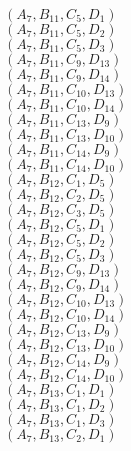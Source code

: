 \documentclass[14pt]{article}
\begin{document}
    $({A}_{7}, {B}_{11}, {C}_{5}, {D}_{1}) $ \\ 
    $({A}_{7}, {B}_{11}, {C}_{5}, {D}_{2}) $ \\ 
    $({A}_{7}, {B}_{11}, {C}_{5}, {D}_{3}) $ \\ 
    $({A}_{7}, {B}_{11}, {C}_{9}, {D}_{13}) $ \\ 
    $({A}_{7}, {B}_{11}, {C}_{9}, {D}_{14}) $ \\ 
    $({A}_{7}, {B}_{11}, {C}_{10}, {D}_{13}) $ \\ 
    $({A}_{7}, {B}_{11}, {C}_{10}, {D}_{14}) $ \\ 
    $({A}_{7}, {B}_{11}, {C}_{13}, {D}_{9}) $ \\ 
    $({A}_{7}, {B}_{11}, {C}_{13}, {D}_{10}) $ \\ 
    $({A}_{7}, {B}_{11}, {C}_{14}, {D}_{9}) $ \\ 
    $({A}_{7}, {B}_{11}, {C}_{14}, {D}_{10}) $ \\ 
    $({A}_{7}, {B}_{12}, {C}_{1}, {D}_{5}) $ \\ 
    $({A}_{7}, {B}_{12}, {C}_{2}, {D}_{5}) $ \\ 
    $({A}_{7}, {B}_{12}, {C}_{3}, {D}_{5}) $ \\ 
    $({A}_{7}, {B}_{12}, {C}_{5}, {D}_{1}) $ \\ 
    $({A}_{7}, {B}_{12}, {C}_{5}, {D}_{2}) $ \\ 
    $({A}_{7}, {B}_{12}, {C}_{5}, {D}_{3}) $ \\ 
    $({A}_{7}, {B}_{12}, {C}_{9}, {D}_{13}) $ \\ 
    $({A}_{7}, {B}_{12}, {C}_{9}, {D}_{14}) $ \\ 
    $({A}_{7}, {B}_{12}, {C}_{10}, {D}_{13}) $ \\ 
    $({A}_{7}, {B}_{12}, {C}_{10}, {D}_{14}) $ \\ 
    $({A}_{7}, {B}_{12}, {C}_{13}, {D}_{9}) $ \\ 
    $({A}_{7}, {B}_{12}, {C}_{13}, {D}_{10}) $ \\ 
    $({A}_{7}, {B}_{12}, {C}_{14}, {D}_{9}) $ \\ 
    $({A}_{7}, {B}_{12}, {C}_{14}, {D}_{10}) $ \\ 
    $({A}_{7}, {B}_{13}, {C}_{1}, {D}_{1}) $ \\ 
    $({A}_{7}, {B}_{13}, {C}_{1}, {D}_{2}) $ \\ 
    $({A}_{7}, {B}_{13}, {C}_{1}, {D}_{3}) $ \\ 
    $({A}_{7}, {B}_{13}, {C}_{2}, {D}_{1}) $ \\ 
\end{document}
